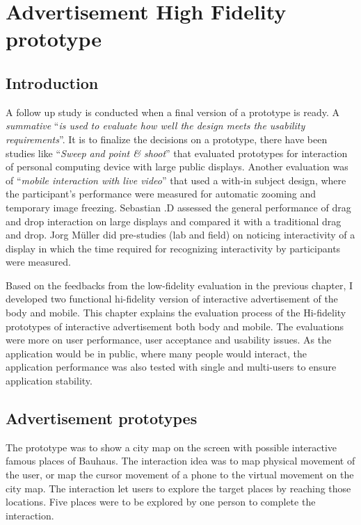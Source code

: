 \chapter{Advertisement High Fidelity prototype} %

\label{Chapter6} %

\newpage

\section{Introduction}
A follow up study is conducted when a final version of a prototype is ready. A \emph{summative} ``\emph{is used to evaluate how well the design meets the usability requirements}''\cite{summative}. It is to finalize the decisions on a prototype, there have been studies like ``\emph{Sweep and point \& shoot}'' \cite{SweepPointShoot} that evaluated prototypes for interaction of personal computing device with large public displays. Another evaluation was of ``\emph{mobile interaction with live video}'' \cite{TouchProjector} that used a with-in subject design, where the participant’s performance were measured for automatic zooming and temporary image freezing. Sebastian .D \cite{WalldragandDrop} assessed the general performance of drag and drop interaction on large displays and compared it with a traditional drag and drop. Jorg Müller \cite{LookingGlass} did pre-studies (lab and field) on noticing interactivity of a display in which the time required for recognizing interactivity by participants were measured.

Based on the feedbacks from the low-fidelity evaluation in the previous chapter, I developed two functional hi-fidelity version of interactive advertisement of the body and mobile. This chapter explains the evaluation process of the Hi-fidelity prototypes of interactive advertisement both body and mobile. The evaluations were more on user performance, user acceptance and usability issues. As the application would be in public, where many people would interact, the application performance was also tested with single and multi-users to ensure application stability.


\section{Advertisement prototypes}
The prototype was to show a city map on the screen with possible interactive famous places of Bauhaus. The interaction idea was to map physical movement of the user, or map the cursor movement of a phone to the virtual movement on the city map. The interaction let users to explore the target places by reaching those locations. Five places were to be explored by one person to complete the interaction.


